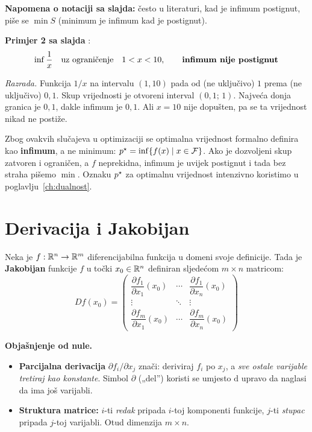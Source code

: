 \textbf{Napomena o notaciji sa slajda:} često u literaturi, kad je infimum
postignut, piše se $\min S$ (minimum je infimum kad je postignut).

\textbf{Primjer 2 sa slajda} :
\[
\inf \frac{1}{x} \quad \text{uz ograničenje} \quad 1 < x < 10,
\qquad \text{\textbf{infimum nije postignut}}
\]

\emph{Razrada.} Funkcija $1/x$ na intervalu $(1, 10)$ pada od (ne uključivo)
$1$ prema (ne uključivo) $0{,}1$. Skup vrijednosti je otvoreni interval
$(0{,}1;\, 1)$. Najveća donja granica je $0{,}1$, dakle infimum je $0{,}1$. Ali
$x = 10$ nije dopušten, pa se ta vrijednost nikad ne postiže.

\begin{napomena}
Zbog ovakvih slučajeva u optimizaciji se optimalna vrijednost formalno definira
kao \textbf{infimum}, a ne minimum:
$p^{\star} = \inf\{f(x) \mid x \in \mathcal{F}\}$. Ako je dozvoljeni skup zatvoren i
ograničen, a $f$ neprekidna, infimum je uvijek postignut i tada bez straha
pišemo $\min$. Oznaku $p^{\star}$ za optimalnu vrijednost intenzivno koristimo u
poglavlju~\ref{ch:dualnost}.
\end{napomena}

\section{Derivacija i Jakobijan}

\begin{definicija}[Jakobijan]
Neka je $f : \mathbb{R}^n \to \mathbb{R}^m$ diferencijabilna funkcija u domeni svoje
definicije. Tada je \textbf{Jakobijan} funkcije $f$ u točki $x_0 \in \mathbb{R}^n$
definiran sljedećom $m \times n$ matricom:
\[
Df(x_0) =
\begin{pmatrix}
\dfrac{\partial f_1}{\partial x_1}(x_0) & \cdots &
\dfrac{\partial f_1}{\partial x_n}(x_0) \\[10pt]
\vdots & \ddots & \vdots \\[6pt]
\dfrac{\partial f_m}{\partial x_1}(x_0) & \cdots &
\dfrac{\partial f_m}{\partial x_n}(x_0)
\end{pmatrix}
\]
\end{definicija}

\textbf{Objašnjenje od nule.}

\begin{itemize}
  \item \textbf{Parcijalna derivacija} $\partial f_i/\partial x_j$ znači:
        deriviraj $f_i$ po $x_j$, a \emph{sve ostale varijable tretiraj kao
        konstante}. Simbol $\partial$ („del”) koristi se umjesto $\mathrm{d}$
        upravo da naglasi da ima još varijabli.
  \item \textbf{Struktura matrice:} $i$-ti \emph{redak} pripada $i$-toj
        komponenti funkcije, $j$-ti \emph{stupac} pripada $j$-toj varijabli.
        Otud dimenzija $m \times n$.
\end{itemize}

